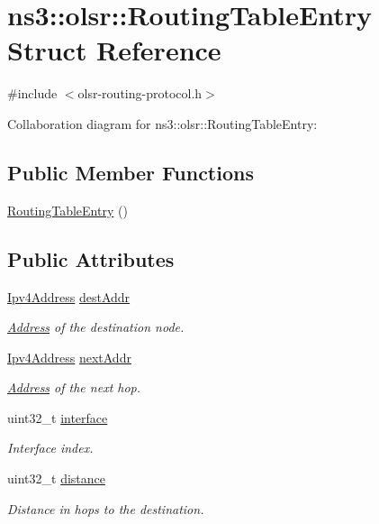 \hypertarget{structns3_1_1olsr_1_1RoutingTableEntry}{}\section{ns3\+:\+:olsr\+:\+:Routing\+Table\+Entry Struct Reference}
\label{structns3_1_1olsr_1_1RoutingTableEntry}


{\ttfamily \#include $<$olsr-\/routing-\/protocol.\+h$>$}



Collaboration diagram for ns3\+:\+:olsr\+:\+:Routing\+Table\+Entry\+:
\subsection*{Public Member Functions}
\begin{DoxyCompactItemize}
\item 
\hyperlink{structns3_1_1olsr_1_1RoutingTableEntry_a01e12b95d130a3b2bdce9fa6cc2a9433}{Routing\+Table\+Entry} ()
\end{DoxyCompactItemize}
\subsection*{Public Attributes}
\begin{DoxyCompactItemize}
\item 
\hyperlink{classns3_1_1Ipv4Address}{Ipv4\+Address} \hyperlink{structns3_1_1olsr_1_1RoutingTableEntry_af27e6b47a959c82c6066826046a9db73}{dest\+Addr}
\begin{DoxyCompactList}\small\item\em \hyperlink{classns3_1_1Address}{Address} of the destination node. \end{DoxyCompactList}\item 
\hyperlink{classns3_1_1Ipv4Address}{Ipv4\+Address} \hyperlink{structns3_1_1olsr_1_1RoutingTableEntry_aa22120ed9301ffc9cd49c782cf4ecf9a}{next\+Addr}
\begin{DoxyCompactList}\small\item\em \hyperlink{classns3_1_1Address}{Address} of the next hop. \end{DoxyCompactList}\item 
uint32\+\_\+t \hyperlink{structns3_1_1olsr_1_1RoutingTableEntry_ab644bb20e4bd9d5be0d28ed8e107ff6c}{interface}
\begin{DoxyCompactList}\small\item\em Interface index. \end{DoxyCompactList}\item 
uint32\+\_\+t \hyperlink{structns3_1_1olsr_1_1RoutingTableEntry_a346f3c48ef17128a0b0a9f97398e497b}{distance}
\begin{DoxyCompactList}\small\item\em Distance in hops to the destination. \end{DoxyCompactList}\end{DoxyCompactItemize}


